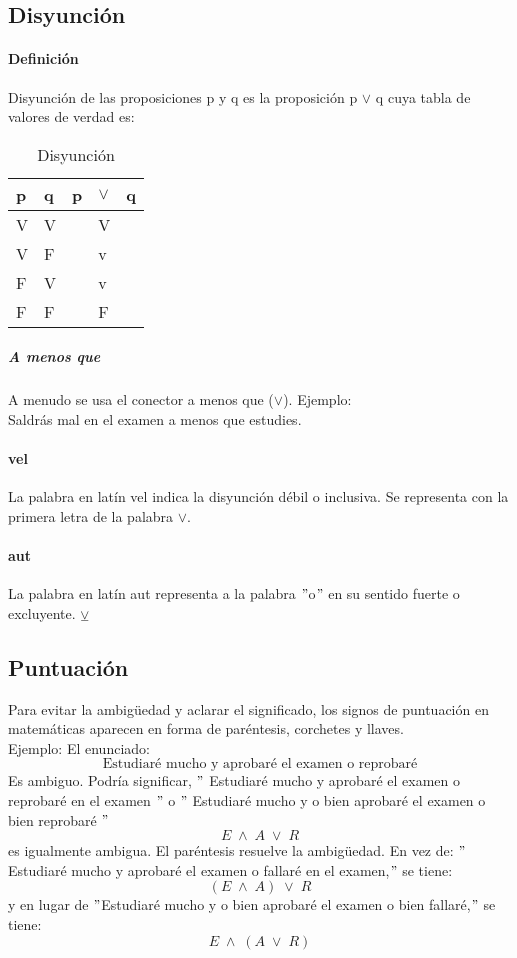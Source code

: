 \documentclass[10pt]{book} 						%
\begin{document}
\subsection{Disyunción}
\paragraph{Definición}
Disyunción de las proposiciones p y q es la proposición p $\lor$ q cuya tabla de valores de verdad es:
\begin{table}[htbp]
  \centering
  \caption{Disyunción}
    \begin{tabular}{l|l|rlr}
    p     & q     & \multicolumn{1}{l}{p} & $\lor$     & \multicolumn{1}{l}{q} \\
    \midrule
    V     & V     &       & V     &  \\
    V     & F     &       & v     &  \\
    F     & V     &       & v     &  \\
    F     & F     &       & F     &  \\
    \end{tabular}%
  \label{tab:addlabel}%
\end{table}%
\subparagraph{A menos que} A menudo se usa el conector a menos que ($\lor$). Ejemplo:\\
Saldrás mal en el examen a menos que estudies.
\paragraph{vel} La palabra en latín vel indica la disyunción débil o inclusiva. Se representa con la primera letra de la palabra $\lor$.  
\paragraph{aut} La palabra en latín aut representa a la palabra $"$o$"$ en su sentido fuerte o excluyente. $\veebar$
\subsection{Puntuación}
Para evitar la ambigüedad y aclarar el significado, los signos de puntuación en matemáticas aparecen en forma de paréntesis, corchetes y llaves.\\
Ejemplo:
El enunciado:\\
$$ \mbox{Estudiaré mucho y aprobaré el examen o reprobaré} $$
Es ambiguo. Podría significar, $"$ Estudiaré mucho y aprobaré el examen o reprobaré en el examen $"$ o $"$ Estudiaré mucho y o bien aprobaré el examen o bien reprobaré $"$
$$ E \; \land  \; A \; \lor  \; R $$
es igualmente ambigua. El paréntesis resuelve la ambigüedad. En vez de: $"$Estudiaré mucho y aprobaré el examen o fallaré en el examen,$"$ se tiene:
$$ (E \; \land  \; A)\;\lor \; R $$
y en lugar de $"$Estudiaré mucho y o bien aprobaré el examen o bien fallaré,$"$ se tiene:
$$ E \; \land \; (A \; \lor \; R) $$
\end{document}

